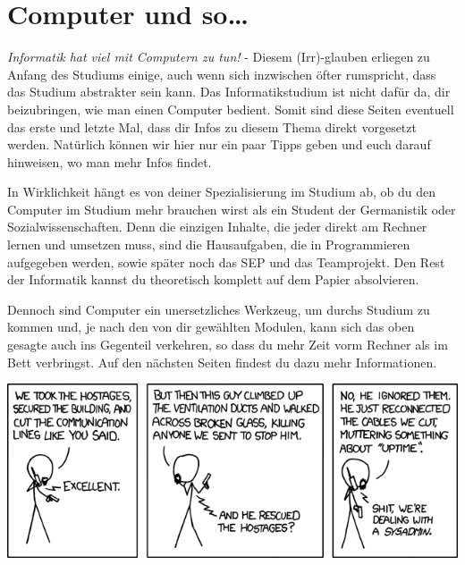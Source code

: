 \section{Computer und so\ldots}
	\begin{multicols}{2}
	\label{computer}
	\emph{Informatik hat viel mit Computern zu tun!} - Diesem (Irr)-glauben erliegen zu Anfang des Studiums einige, auch wenn sich inzwischen öfter rumspricht, dass das Studium abstrakter sein kann. Das Informatikstudium ist nicht dafür da, dir beizubringen, wie man einen Computer bedient. Somit sind diese Seiten eventuell das erste und letzte Mal,  dass dir Infos zu diesem Thema direkt vorgesetzt werden. Natürlich können wir hier nur ein paar Tipps geben und euch darauf hinweisen, wo man mehr Infos  findet.

	In Wirklichkeit hängt es von deiner Spezialisierung im Studium ab, ob  du den Computer im Studium mehr brauchen wirst als ein Student der Germanistik oder Sozialwissenschaften. Denn die einzigen Inhalte,  die jeder direkt am Rechner lernen und umsetzen muss, sind die Hausaufgaben,  die in Programmieren aufgegeben werden, sowie später noch das SEP und das Teamprojekt. Den Rest der Informatik kannst du theoretisch komplett auf dem Papier absolvieren.

	Dennoch sind Computer ein unersetzliches Werkzeug, um durchs Studium zu kommen und, je nach den von dir gewählten Modulen, kann sich das oben gesagte auch ins Gegenteil verkehren, so dass du mehr Zeit vorm Rechner als im Bett verbringst. Auf den nächsten Seiten findest du dazu mehr Informationen.






\end{multicols}
\begin{center}
		\includegraphics[totalheight=6cm]{bilder/XKCD/devotion_to_duty}
\end{center}